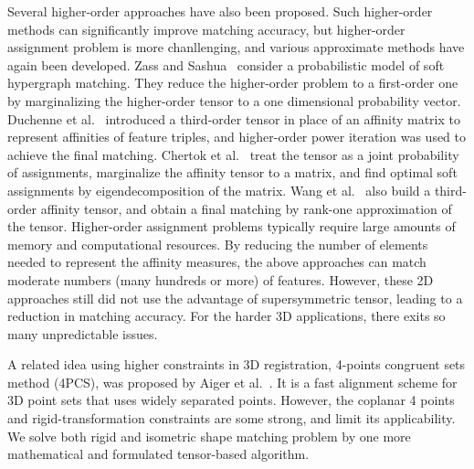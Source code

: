 Several higher-order approaches have also been proposed.
Such higher-order methods can significantly improve matching accuracy,
but higher-order assignment problem is more chanllenging, and various approximate methods have again been developed.
Zass and Sashua~\cite{Zass08} consider a probabilistic model of soft hypergraph matching.
They reduce the higher-order problem to a first-order one by marginalizing the higher-order tensor to a one dimensional probability vector.
Duchenne et al.~\cite{Duchenne09} introduced a third-order tensor in place of an affinity matrix to represent affinities of feature triples,
and higher-order power iteration was used to achieve the final matching.
Chertok et al.~\cite{Chertok10} treat the tensor as a joint probability of assignments, marginalize the affinity tensor to a matrix,
and find optimal soft assignments by eigendecomposition of the matrix.
Wang et al.~\cite{Aiping10} also build a third-order affinity tensor, and obtain a final matching by rank-one approximation of the tensor.
Higher-order assignment problems typically require large amounts of memory and computational resources.
By reducing the number of elements needed to represent the affinity measures,
the above approaches can match moderate numbers (many hundreds or more) of features.
However, these 2D approaches still did not use the advantage of supersymmetric tensor, leading to a reduction in matching accuracy.
For the harder 3D applications, there exits so many unpredictable issues.

A related idea using higher constraints in 3D registration, 4-points congruent sets method (4PCS), was proposed by Aiger et al.~\cite{Aiger08}.
It is a fast alignment scheme for 3D point sets that uses widely separated points.
However, the coplanar 4 points and rigid-transformation constraints are some strong, and limit its applicability.
We solve both rigid and isometric shape matching problem by one more mathematical and formulated tensor-based algorithm.
